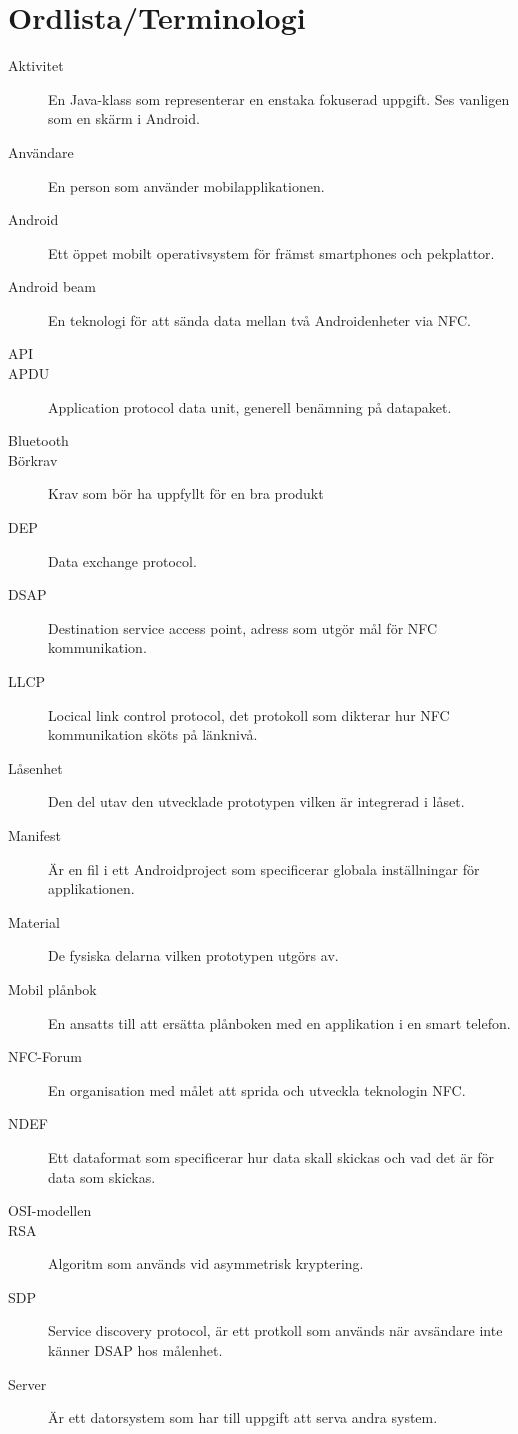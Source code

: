 \documentclass[11pt]{article}
\begin{document}
\section*{Ordlista/Terminologi}
\begin{description}
\item[Aktivitet] En Java-klass som representerar en enstaka fokuserad uppgift. Ses vanligen som en skärm i Android.
\item[Användare] En person som använder mobilapplikationen.
\item[Android] Ett öppet mobilt operativsystem för främst smartphones och pekplattor.
\item[Android beam] En teknologi för att sända data mellan två Androidenheter via NFC.
\item[API]
\item[APDU] Application protocol data unit, generell benämning på datapaket.
\item[Bluetooth]
\item[Börkrav] Krav som bör ha uppfyllt för en bra produkt
\item[DEP] Data exchange protocol.
\item[DSAP] Destination service access point, adress som utgör mål för NFC kommunikation.
\item[LLCP] Locical link control protocol, det protokoll som dikterar hur NFC kommunikation sköts på länknivå.
\item[Låsenhet] Den del utav den utvecklade prototypen vilken är integrerad i låset.
\item[Manifest] Är en fil i ett Androidproject som specificerar globala inställningar för applikationen.
\item[Material] De fysiska delarna vilken prototypen utgörs av.
\item[Mobil plånbok] En ansatts till att ersätta plånboken med en applikation i en smart telefon.
\item[NFC-Forum] En organisation med målet att sprida och utveckla teknologin NFC.
\item[NDEF] Ett dataformat som specificerar hur data skall skickas och vad det är för data som skickas.
\item[OSI-modellen]
\item[RSA] Algoritm som används vid asymmetrisk kryptering.
\item[SDP] Service discovery protocol, är ett protkoll som används när avsändare inte känner DSAP hos målenhet.
\item[Server] Är ett datorsystem som har till uppgift att serva andra system.

\end{description}
\end{document}
